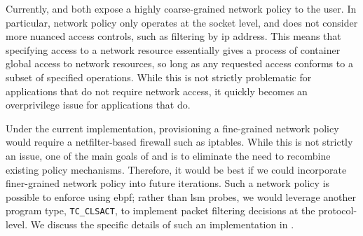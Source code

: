 
Currently, \bpfbox{} and \bpfcontain{} both expose a highly coarse-grained network policy
to the user. In particular, network policy only operates at the socket level, and does not
consider more nuanced access controls, such as filtering by \gls{ip} address. This means
that specifying access to a network resource essentially gives a process of container
global access to network resources, so long as any requested access conforms to a subset
of specified operations. While this is not strictly problematic for applications that do
not require network access, it quickly becomes an overprivilege issue for applications
that do.

Under the current implementation, provisioning a fine-grained network policy would require
a netfilter-based firewall such as iptables. While this is not strictly an issue, one of
the main goals of \bpfbox{} and \bpfcontain{} is to eliminate the need to recombine
existing policy mechanisms. Therefore, it would be best if we could incorporate
finer-grained network policy into future iterations. Such a network policy is possible to
enforce using \gls{ebpf}; rather than \gls{lsm} probes, we would leverage another program
type, \texttt{TC\_CLSACT}, to implement packet filtering decisions at the protocol-level.
We discuss the specific details of such an implementation in
.


